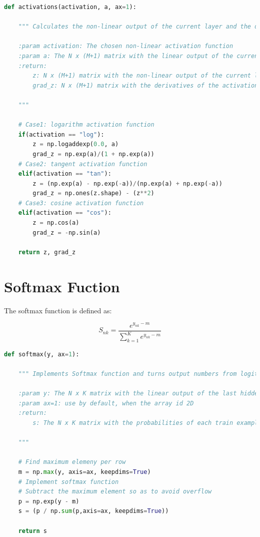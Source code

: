 \documentclass[11pt]{article}
\begin{document}
\begin{lstlisting}[language = Python]
def activations(activation, a, ax=1):
    
    """ Calculates the non-linear output of the current layer and the derivative of the activation function used.
    
    :param activation: The chosen non-linear activation function
    :param a: The N x (M+1) matrix with the linear output of the current layer
    :return: 
        z: N x (M+1) matrix with the non-linear output of the current layer and
        grad_z: N x (M+1) matrix with the derivatives of the activation function
        
    """
    
    # Case1: logarithm activation function
    if(activation == "log"):
        z = np.logaddexp(0.0, a)
        grad_z = np.exp(a)/(1 + np.exp(a))   
    # Case2: tangent activation function
    elif(activation == "tan"):
        z = (np.exp(a) - np.exp(-a))/(np.exp(a) + np.exp(-a))
        grad_z = np.ones(z.shape) - (z**2)
    # Case3: cosine activation function
    elif(activation == "cos"):
        z = np.cos(a)
        grad_z = -np.sin(a)
        
    return z, grad_z
\end{lstlisting}
    \newpage
    
    \section{Softmax Fuction}
The softmax function is defined as: 

\begin{equation}
S_{nk} = \frac{e^{{y_{nk}-m}}}{\sum_{k=1}^K e^{{y_{nk}-m}}}
\end{equation}
\begin{lstlisting}[language = Python]
def softmax(y, ax=1):
    
    """ Implements Softmax function and turns output numbers from logits layer into probabilities that sum to one.
    
    :param y: The N x K matrix with the linear output of the last hidden layer
    :param ax=1: use by default, when the array id 2D
    :return: 
        s: The N x K matrix with the probabilities of each train example n belong to each category 
        
    """
    
    # Find maximum elemeny per row
    m = np.max(y, axis=ax, keepdims=True)
    # Implement softmax function
    # Subtract the maximum element so as to avoid overflow
    p = np.exp(y - m)
    s = (p / np.sum(p,axis=ax, keepdims=True))
    
    return s
\end{lstlisting}
 
\end{document}
